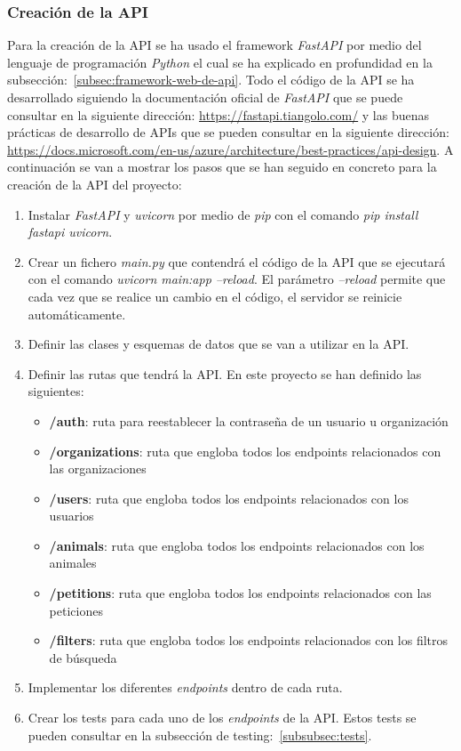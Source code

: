 \subsubsection{Creación de la API}\label{subsubsec:creacion-de-la-api}

Para la creación de la API se ha usado el framework \textit{FastAPI} por medio del lenguaje de programación \textit{Python} el cual
se ha explicado en profundidad en la subsección:~\ref{subsec:framework-web-de-api}. Todo el código de la API se ha desarrollado
siguiendo la documentación oficial de \textit{FastAPI} que se puede consultar en la siguiente dirección: \url{https://fastapi.tiangolo.com/} y
las buenas prácticas de desarrollo de APIs que se pueden consultar en la siguiente dirección: \url{https://docs.microsoft.com/en-us/azure/architecture/best-practices/api-design}.
A continuación se van a mostrar los pasos que se han seguido en concreto para la creación de la API del proyecto:

\begin{enumerate}
    \item Instalar \textit{FastAPI} y \textit{uvicorn} por medio de \textit{pip} con el comando
    \textit{pip install fastapi uvicorn}.
    \item Crear un fichero \textit{main.py} que contendrá el código de la API que se ejecutará con el comando
    \textit{uvicorn main:app --reload}. El parámetro \textit{--reload} permite que cada vez que se realice un cambio
    en el código, el servidor se reinicie automáticamente.
    \item Definir las clases y esquemas de datos que se van a utilizar en la API.
    \item Definir las rutas que tendrá la API. En este proyecto se han definido las siguientes:
        \begin{itemize}
            \item \textbf{/auth}: ruta para reestablecer la contraseña de un usuario u organización
            \item \textbf{/organizations}: ruta que engloba todos los endpoints relacionados con las organizaciones
            \item \textbf{/users}: ruta que engloba todos los endpoints relacionados con los usuarios
            \item \textbf{/animals}: ruta que engloba todos los endpoints relacionados con los animales
            \item \textbf{/petitions}: ruta que engloba todos los endpoints relacionados con las peticiones
            \item \textbf{/filters}: ruta que engloba todos los endpoints relacionados con los filtros de búsqueda
        \end{itemize}
    \item Implementar los diferentes \textit{endpoints} dentro de cada ruta.
    \item Crear los tests para cada uno de los \textit{endpoints} de la API. Estos tests se pueden consultar en la
    subsección de testing:~\ref{subsubsec:tests}.
\end{enumerate}

